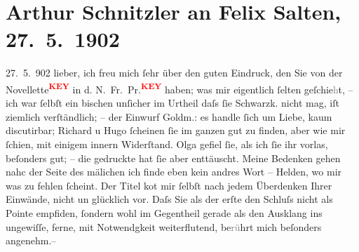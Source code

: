                \section[Arthur Schnitzler an Felix Salten, 27. 5. 1902]{ Arthur Schnitzler an Felix Salten, 27. 5. 1902}\nopagebreak{}\rehead{ }\begin{ledgroupsized}[t]{13cm}\normalsize\beginnumbering \toendnotes[C]{\smallbreak\pagebreak[2]} 
\toendnotes[C]{\smallbreak}\pstart
           \raggedleft{}{\pb}27. 5. 902\pend
           \pstart
           lieber, ich freu mich ſehr über den guten Eindruck, den Sie von der
                  Novellette\textcolor{red}{\textsuperscript{\textbf{KEY}}} in d. N. Fr. Pr.\textcolor{red}{\textsuperscript{\textbf{KEY}}}
               haben; was mir eigentlich ſelten geſchie\textcolor{gray}{h}t, – ich war ſelbſt ein
               bischen unſicher im Urtheil daſs ſie Schwarzk.
               nicht mag, iſt ziemlich verſtändlich; – der Einwurf Goldm.: es handle ſich um Liebe, kaum discutirbar; Richard u Hugo
               ſcheinen ſie im ganzen gut zu finden, aber {\pb}wie mir ſchien, mit einigem innern
               Widerſtand. Olga gefiel ſie, als ich ſie ihr vorlas,
               beſonders gut; – die gedruckte hat ſie aber enttäuscht. Meine Bedenken gehen nahc der
               Seite des mä{\geminationn}lichen {\dotstwo} ich finde eben kein andres Wort –
               Helden{\dotstwo}, wo mir was zu fehlen ſcheint. Der Titel ko{\geminationm}t
               mir ſelbſt nach jedem Überdenken Ihrer Einwände, nicht un {\pb}glücklich vor. Daſs Sie als der
               erſte den Schluſs nicht als Pointe empfiden, ſondern wohl im Gegentheil gerade als
               den Ausklang ins ungewiſſe, ferne, mit Notwendgkeit weiterflutend,
                  be\textcolor{gray}{rü}hrt mich beſonders angenehm.– \pend

\end{ledgroupsized}
